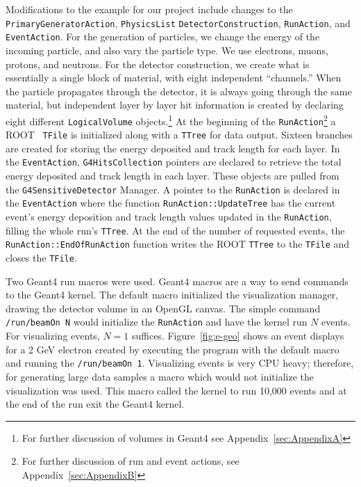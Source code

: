 \documentclass[aps,prd,twocolumn,nofootinbib]{revtex4-1}
\begin{document}
Modifications to the example for our project include changes to the \texttt{PrimaryGeneratorAction}, \texttt{PhysicsList} \texttt{DetectorConstruction}, \texttt{RunAction}, and \texttt{EventAction}. For the generation of particles, we change the energy of the incoming particle, and also vary the particle type. We use electrons, muons, protons, and neutrons. For the detector construction, we create what is essentially a single block of material, with eight independent ``channels.'' When the particle propagates through the detector, it is always going through the same material, but independent layer by layer hit information is created by declaring eight different \texttt{LogicalVolume} objects.\footnote{For further discussion of volumes in Geant4 see Appendix~\ref{sec:AppendixA}} At the beginning of the \texttt{RunAction}\footnote{For further discussion of run and event actions, see Appendix~\ref{sec:AppendixB}} a ROOT~\cite{ROOT} \texttt{TFile} is initialized along with a \texttt{TTree} for data output. Sixteen branches are created for storing the energy deposited and track length for each layer. In the \texttt{EventAction}, \texttt{G4HitsCollection} pointers are declared to retrieve the total energy deposited and track length in each layer. These objects are pulled from the \texttt{G4SensitiveDetector} Manager. A pointer to the \texttt{RunAction} is declared in the \texttt{EventAction} where the function \texttt{RunAction::UpdateTree} has the current event's energy deposition and track length values updated in the \texttt{RunAction}, filling the whole run's \texttt{TTree}. At the end of the number of requested events, the \texttt{RunAction::EndOfRunAction} function writes the ROOT \texttt{TTree} to the \texttt{TFile} and closes the \texttt{TFile}.

Two Geant4 run macros were used. Geant4 macros are a way to send commands to the Geant4 kernel. The default macro initialized the visualization manager, drawing the detector volume in an OpenGL canvas. The simple command \texttt{/run/beamOn N} would initialize the \texttt{RunAction} and have the kernel run $N$ events. For visualizing events, $N=1$ suffices. Figure~\ref{fig:e-geo} shows an event displays for a 2 GeV electron created by executing the program with the default macro and running the \texttt{/run/beamOn 1}. Visualizing events is very CPU heavy; therefore, for generating large data samples a macro which would not initialize the visualization was used. This macro called the kernel to run 10,000 events and at the end of the run exit the Geant4 kernel.
\end{document}
